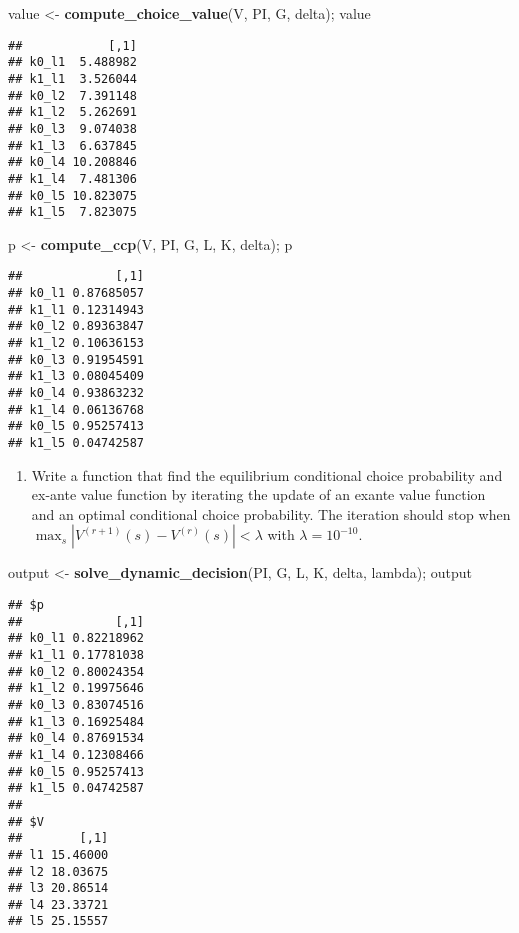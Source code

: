 \documentclass[
]{book}
\newenvironment{Shaded}{\begin{snugshade}}{\end{snugshade}}
\newcommand{\KeywordTok}[1]{\textcolor[rgb]{0.13,0.29,0.53}{\textbf{#1}}}
\newcommand{\NormalTok}[1]{#1}
\newcommand{\StringTok}[1]{\textcolor[rgb]{0.31,0.60,0.02}{#1}}
\providecommand{\tightlist}{%
  \setlength{\itemsep}{0pt}\setlength{\parskip}{0pt}}
\begin{document}
\begin{Shaded}
\begin{Highlighting}[]
\NormalTok{value <-}\StringTok{ }\KeywordTok{compute_choice_value}\NormalTok{(V, PI, G, delta); value}
\end{Highlighting}
\end{Shaded}

\begin{verbatim}
##            [,1]
## k0_l1  5.488982
## k1_l1  3.526044
## k0_l2  7.391148
## k1_l2  5.262691
## k0_l3  9.074038
## k1_l3  6.637845
## k0_l4 10.208846
## k1_l4  7.481306
## k0_l5 10.823075
## k1_l5  7.823075
\end{verbatim}

\begin{Shaded}
\begin{Highlighting}[]
\NormalTok{p <-}\StringTok{ }\KeywordTok{compute_ccp}\NormalTok{(V, PI, G, L, K, delta); p}
\end{Highlighting}
\end{Shaded}

\begin{verbatim}
##             [,1]
## k0_l1 0.87685057
## k1_l1 0.12314943
## k0_l2 0.89363847
## k1_l2 0.10636153
## k0_l3 0.91954591
## k1_l3 0.08045409
## k0_l4 0.93863232
## k1_l4 0.06136768
## k0_l5 0.95257413
## k1_l5 0.04742587
\end{verbatim}

\begin{enumerate}
\def\labelenumi{\arabic{enumi}.}
\setcounter{enumi}{4}
\tightlist
\item
  Write a function that find the equilibrium conditional choice probability and ex-ante value function by iterating the update of an exante value function and an optimal conditional choice probability. The iteration should stop when \(\max_s|V^{(r + 1)}(s) - V^{(r)}(s)| < \lambda\) with \(\lambda = 10^{-10}\).
\end{enumerate}

\begin{Shaded}
\begin{Highlighting}[]
\NormalTok{output <-}\StringTok{ }\KeywordTok{solve_dynamic_decision}\NormalTok{(PI, G, L, K, delta, lambda); output}
\end{Highlighting}
\end{Shaded}

\begin{verbatim}
## $p
##             [,1]
## k0_l1 0.82218962
## k1_l1 0.17781038
## k0_l2 0.80024354
## k1_l2 0.19975646
## k0_l3 0.83074516
## k1_l3 0.16925484
## k0_l4 0.87691534
## k1_l4 0.12308466
## k0_l5 0.95257413
## k1_l5 0.04742587
## 
## $V
##        [,1]
## l1 15.46000
## l2 18.03675
## l3 20.86514
## l4 23.33721
## l5 25.15557
\end{verbatim}
\end{document}
